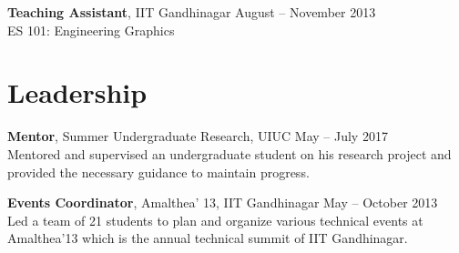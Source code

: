 \documentclass[margin]{res}
\begin{document}
\begin{resume}
{\bf Teaching Assistant}, IIT Gandhinagar \hfill August -- November 2013 \\
ES 101: Engineering Graphics


\section{\large Leadership}
{\bf Mentor}, Summer Undergraduate Research, UIUC \hfill May -- July 2017 \\
Mentored and supervised an undergraduate student on his research project and provided the necessary guidance to maintain progress.

{\bf Events Coordinator}, Amalthea' 13, IIT Gandhinagar \hfill May -- October 2013 \\
Led a team of 21 students to plan and organize various technical events at Amalthea'13 which is the annual technical summit of IIT Gandhinagar.

%
%

\end{resume}
\end{document}
